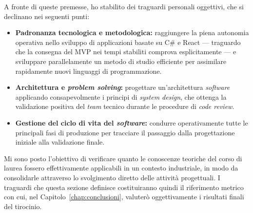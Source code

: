 A fronte di queste premesse, ho stabilito dei traguardi personali oggettivi, che si declinano nei seguenti punti:
\begin{itemize}
    \item \textbf{Padronanza tecnologica e metodologica:} raggiungere la piena autonomia operativa nello sviluppo di applicazioni basate su C\# e React --- traguardo che la consegna del MVP nei tempi stabiliti comprova esplicitamente --- e sviluppare parallelamente un metodo di studio efficiente per assimilare rapidamente nuovi linguaggi di programmazione.
    \item \textbf{Architettura e \textit{problem solving}:} progettare un'architettura \textit{software} applicando consapevolmente i principi di \textit{system design}, che ottenga la validazione positiva del \textit{team} tecnico durante le procedure di \textit{code review}.
    \item \textbf{Gestione del ciclo di vita del \textit{software}:} condurre operativamente tutte le principali fasi di produzione per tracciare il passaggio dalla progettazione iniziale alla validazione finale.
\end{itemize}

Mi sono posto l'obiettivo di verificare quanto le conoscenze teoriche del corso di laurea fossero effettivamente applicabili in un contesto industriale, in modo da consolidarle attraverso lo svolgimento diretto delle attività progettuali. I traguardi che questa sezione definisce costituiranno quindi il riferimento metrico con cui, nel Capitolo~\ref{chap:conclusioni}, valuterò oggettivamente i risultati finali del tirocinio.